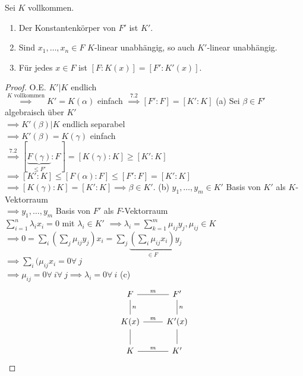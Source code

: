 \begin{satz}
    Sei $K$ vollkommen.
    \begin{enumerate}[label=(\alph*)]
        \item Der Konstantenkörper von $F'$ ist $K'$.
        \item Sind $x_1,\ldots,x_n \in F$ $K$-linear unabhängig, so auch $K'$-linear unabhängig.
        \item Für jedes $x \in F$ ist $[F:K(x)]=[F':K'(x)]$.
    \end{enumerate}
\end{satz}
\begin{proof}
    O.E. $K'|K$ endlich\\
    $\stackrel{K \text{ vollkommen}}{\implies} K'=K(\alpha)$ einfach $\stackrel{7.2}{\implies} [F':F] = [K':K]$\nl
    (a) Sei $\beta \in F'$ algebraisch über $K'$\\
    $\implies K'(\beta)|K$ endlich separabel\\
    $\implies K'(\beta)=K(\gamma)$ einfach\\
    $\stackrel{7.2}{\implies} [\underbrace{F(\gamma)}_{\leq F'}:F] =[K(\gamma):K] \geq [K':K]$\\
    $\implies [K':K] \leq [F(\alpha):F] \leq [F':F]=[K':K]$\\
    $\implies [K(\gamma):K] = [K':K] \implies \beta\in K'$.\nl
    (b) $y_1,\ldots,y_m \in K'$ Basis von $K'$ als $K$-Vektorraum\\
    $\implies y_1,\ldots,y_m$ Basis von $F'$ als $F$-Vektorraum\\
    $\sum\limits_{i=1}^n \lambda_ix_i=0$ mit $\lambda_i \in K'$ $\implies \lambda_i = \sum\limits_{k=1}^m \mu_{ij}y_j, \mu_{ij}\in K$\\
    $\implies 0 = \sum\limits_i(\sum\limits_j \mu_{ij}y_j)x_i = \sum\limits_j\underbrace{(\sum\limits_i \mu_{ij}x_i)}_{\in F}y_j$\\
    $ \implies \sum\limits_i(\mu_{ij}x_i = 0 \forall~j$\\
    $\implies \mu_{ij}=0 \forall~i\forall~j \implies \lambda_i = 0 \forall~i$\nl
    (c) $$
    \begin{tikzcd}
        F \rar[dash]{m} \dar[dash]{n} & F' \dar[dash]{n}\\
        K(x) \rar[dash]{m} \dar[dash] & K'(x) \dar[dash]\\
        K \rar[dash]{m} & K'
    \end{tikzcd}$$
\end{proof}

